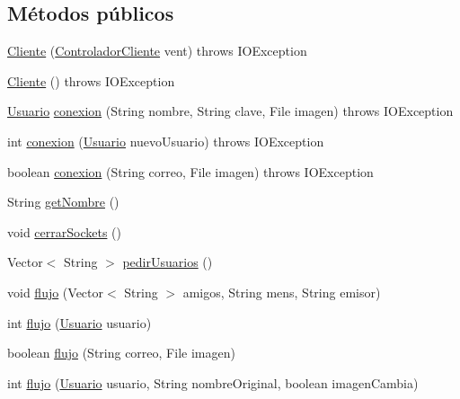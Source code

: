 \subsection*{Métodos públicos}
\begin{DoxyCompactItemize}
\item 
\hyperlink{classcom_1_1ucab_1_1javachat_1_1_cliente_1_1model_1_1_cliente_a96a7afffdedcb21e2fa287056460c163}{Cliente} (\hyperlink{classcom_1_1ucab_1_1javachat_1_1_cliente_1_1controller_1_1_controlador_cliente}{Controlador\-Cliente} vent)  throws I\-O\-Exception    
\item 
\hyperlink{classcom_1_1ucab_1_1javachat_1_1_cliente_1_1model_1_1_cliente_a8322255aefccc8c604eafe3e9197a126}{Cliente} ()  throws I\-O\-Exception    
\item 
\hyperlink{classcom_1_1ucab_1_1javachat_1_1_cliente_1_1model_1_1_usuario}{Usuario} \hyperlink{classcom_1_1ucab_1_1javachat_1_1_cliente_1_1model_1_1_cliente_ad187c584feac2fbaddf36074a7d7ee64}{conexion} (String nombre, String clave, File imagen)  throws I\-O\-Exception 
\item 
int \hyperlink{classcom_1_1ucab_1_1javachat_1_1_cliente_1_1model_1_1_cliente_a56292074d2a5b409b5056db1d07168bd}{conexion} (\hyperlink{classcom_1_1ucab_1_1javachat_1_1_cliente_1_1model_1_1_usuario}{Usuario} nuevo\-Usuario)  throws I\-O\-Exception 
\item 
boolean \hyperlink{classcom_1_1ucab_1_1javachat_1_1_cliente_1_1model_1_1_cliente_a8ff5750a0dd7b1e68373f49be2662ca3}{conexion} (String correo, File imagen)  throws I\-O\-Exception 
\item 
String \hyperlink{classcom_1_1ucab_1_1javachat_1_1_cliente_1_1model_1_1_cliente_a2f102f095b1bd161a90a3d13f1285eeb}{get\-Nombre} ()
\item 
void \hyperlink{classcom_1_1ucab_1_1javachat_1_1_cliente_1_1model_1_1_cliente_ada58df8e38b7252aee067a222029f1bb}{cerrar\-Sockets} ()
\item 
Vector$<$ String $>$ \hyperlink{classcom_1_1ucab_1_1javachat_1_1_cliente_1_1model_1_1_cliente_ae828d3c313aa6e5a38129433baf036ab}{pedir\-Usuarios} ()
\item 
void \hyperlink{classcom_1_1ucab_1_1javachat_1_1_cliente_1_1model_1_1_cliente_a6a000d747c356a8fc093fb9299185b0c}{flujo} (Vector$<$ String $>$ amigos, String mens, String emisor)
\item 
int \hyperlink{classcom_1_1ucab_1_1javachat_1_1_cliente_1_1model_1_1_cliente_ac98f059bfb01929a8fcae393be001e07}{flujo} (\hyperlink{classcom_1_1ucab_1_1javachat_1_1_cliente_1_1model_1_1_usuario}{Usuario} usuario)
\item 
boolean \hyperlink{classcom_1_1ucab_1_1javachat_1_1_cliente_1_1model_1_1_cliente_ae3d51eeea6685fce41818e231c28fd11}{flujo} (String correo, File imagen)
\item 
int \hyperlink{classcom_1_1ucab_1_1javachat_1_1_cliente_1_1model_1_1_cliente_ae9914153c2e3e6fc5a659b5aa1022c67}{flujo} (\hyperlink{classcom_1_1ucab_1_1javachat_1_1_cliente_1_1model_1_1_usuario}{Usuario} usuario, String nombre\-Original, boolean imagen\-Cambia)
\end{DoxyCompactItemize}
